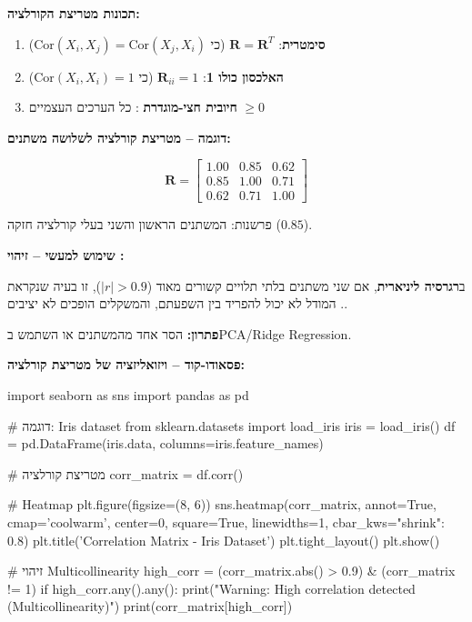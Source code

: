\textbf{תכונות מטריצת הקורלציה:}

\begin{enumerate}
\item \textbf{סימטרית}: $\mathbf{R} = \mathbf{R}^T$ (כי $\text{Cor}(X_i, X_j) = \text{Cor}(X_j, X_i)$)
\item \textbf{האלכסון כולו \num{1}}: $\mathbf{R}_{ii} = 1$ (כי $\text{Cor}(X_i, X_i) = 1$)
\item \textbf{חיובית חצי-מוגדרת} : כל הערכים העצמיים $\geq 0$
\end{enumerate}

\textbf{דוגמה – מטריצת קורלציה לשלושה משתנים:}

\[
\mathbf{R} = \begin{bmatrix}
1.00 & 0.85 & 0.62 \\
0.85 & 1.00 & 0.71 \\
0.62 & 0.71 & 1.00
\end{bmatrix}
\]

פרשנות: המשתנים הראשון והשני בעלי קורלציה חזקה ($0.85$).

\textbf{שימוש למעשי – זיהוי :}

ב\textbf{רגרסיה ליניארית}, אם שני משתנים בלתי תלויים קשורים מאוד ($|r| > 0.9$), זו בעיה שנקראת \textbf{}. המודל לא יכול להפריד בין השפעתם, והמשקלים הופכים לא יציבים.

\textbf{פתרון:} הסר אחד מהמשתנים או השתמש ב\en{-}PCA/Ridge Regression.

\textbf{פסאודו-קוד – ויזואליזציה של מטריצת קורלציה:}

\begin{pythonbox}
import seaborn as sns
import pandas as pd

# דוגמה: Iris dataset
from sklearn.datasets import load_iris
iris = load_iris()
df = pd.DataFrame(iris.data, columns=iris.feature_names)

# מטריצת קורלציה
corr_matrix = df.corr()

# Heatmap
plt.figure(figsize=(8, 6))
sns.heatmap(corr_matrix, annot=True, cmap='coolwarm', center=0,
            square=True, linewidths=1, cbar_kws={"shrink": 0.8})
plt.title('Correlation Matrix - Iris Dataset')
plt.tight_layout()
plt.show()

# זיהוי Multicollinearity
high_corr = (corr_matrix.abs() > 0.9) & (corr_matrix != 1)
if high_corr.any().any():
    print("Warning: High correlation detected (Multicollinearity)")
    print(corr_matrix[high_corr])
\end{pythonbox}

